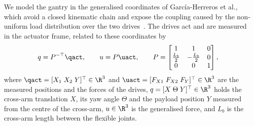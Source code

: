 We model the gantry in the generalised coordinates of Garc\'ia-Herreros et
al., which avoid a closed kinematic chain and expose the coupling caused by
the non-uniform load distribution over the two
drives~\cite[Sec.~2.2]{garcia2013model}.
The drives act and are measured in the actuator frame, related to these
coordinates by
\begin{equation}
  q = P^{-\top}\qact,
  \qquad
  u = P\uact,
  \qquad
  P =
  \begin{bmatrix}
    1 & 1 & 0\\
    \tfrac{L_b}{2} & -\tfrac{L_b}{2} & 0\\
    0 & 0 & 1
  \end{bmatrix},
\label{eq:Ptransform}
\end{equation}
where $\qact=[X_1\;X_2\;Y]^\top\in\R^3$ and
$\uact=[F_{X1}\;F_{X2}\;F_Y]^\top\in\R^3$ are the measured positions and the
forces of the drives, $q=[X\;\Theta\;Y]^\top\in\R^3$ holds the cross-arm
translation $X$, its yaw angle $\Theta$ and the payload position $Y$ measured
from the centre of the cross-arm, $u\in\R^3$ is the generalised force, and
$L_b$ is the cross-arm length between the flexible joints.

